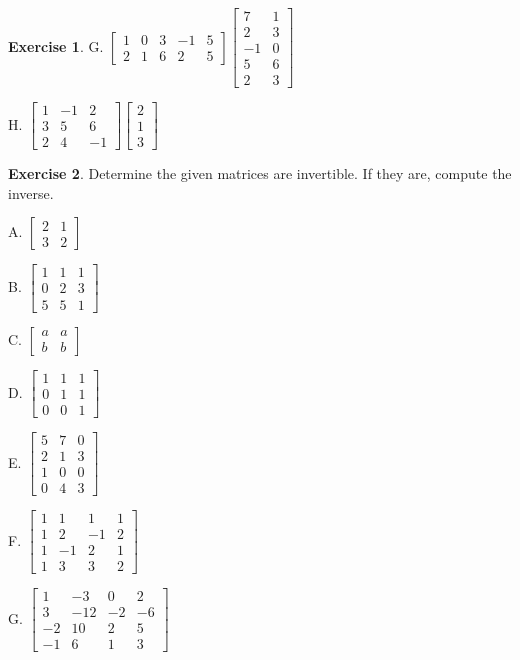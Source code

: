 \documentclass[
]{book}
\theoremstyle{definition}
\theoremstyle{definition}
\theoremstyle{definition}
\newtheorem{exercise}{Exercise}[chapter]
\theoremstyle{definition}
\theoremstyle{remark}
\begin{document}
\begin{exercise}
G. \(\begin{bmatrix} 1 & 0 & 3 & -1 & 5 \\ 2 & 1 & 6 & 2 & 5 \end{bmatrix} \begin{bmatrix} 7 & 1 \\ 2 & 3 \\ -1 & 0 \\ 5 & 6 \\ 2 & 3 \end{bmatrix}\)

H. \(\begin{bmatrix} 1 & -1 & 2 \\ 3 & 5 & 6 \\ 2 & 4 & -1 \end{bmatrix}
\begin{bmatrix} 2 \\ 1 \\ 3 \end{bmatrix}\)
\end{exercise}

\begin{exercise}
\protect\hypertarget{exr:unnamed-chunk-2}{}\label{exr:unnamed-chunk-2}Determine the given matrices are invertible. If they are, compute the inverse.

A. \(\begin{bmatrix} 2 & 1 \\ 3 & 2 \end{bmatrix}\)

B. \(\begin{bmatrix} 1 & 1 & 1 \\ 0 & 2 & 3 \\ 5 & 5 & 1 \end{bmatrix}\)

C. \(\begin{bmatrix} a & a \\ b & b \end{bmatrix}\)

D. \(\begin{bmatrix} 1 & 1 & 1 \\ 0 & 1 & 1 \\ 0 & 0 & 1 \end{bmatrix}\)

E. \(\begin{bmatrix} 5 & 7 & 0 \\ 2 & 1 & 3 \\ 1 & 0 & 0 \\ 0 & 4 & 3 \end{bmatrix}\)

F. \(\begin{bmatrix} 1 & 1 & 1 & 1 \\ 1 & 2 & -1 & 2 \\ 1 & -1 & 2 & 1 \\ 1 & 3 & 3 & 2 \end{bmatrix}\)

G. \(\begin{bmatrix} 1 & -3 & 0 & 2 \\ 3 & -12 & -2 & -6 \\ -2 & 10 & 2 & 5 \\ -1 & 6 & 1 & 3 \end{bmatrix}\)
\end{exercise}
\end{document}
